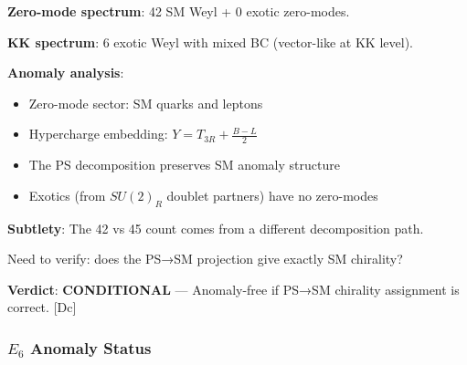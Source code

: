 \documentclass[11pt,a4paper]{article}
\newcommand{\tagDc}{\textcolor{blue!50!black}{[Dc]}}
\begin{document}
\begin{auditbox}
\textbf{Zero-mode spectrum}: 42 SM Weyl + 0 exotic zero-modes.

\textbf{KK spectrum}: 6 exotic Weyl with mixed BC (vector-like at KK level).

\textbf{Anomaly analysis}:
\begin{itemize}
    \item Zero-mode sector: SM quarks and leptons
    \item Hypercharge embedding: $Y = T_{3R} + \frac{B-L}{2}$
    \item The PS decomposition preserves SM anomaly structure
    \item Exotics (from $SU(2)_R$ doublet partners) have no zero-modes
\end{itemize}

\textbf{Subtlety}: The 42 vs 45 count comes from a different decomposition path.

Need to verify: does the PS→SM projection give exactly SM chirality?

\textbf{Verdict}: \textcolor{orange!70!black}{\textbf{CONDITIONAL}} --- Anomaly-free if PS→SM chirality assignment is correct.
\tagDc
\end{auditbox}

\subsubsection{$E_6$ Anomaly Status}
\end{document}
